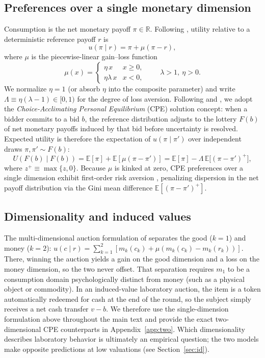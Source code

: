 \documentclass[11pt,a4paper]{article}
\theoremstyle{remark}
\begin{document}
\subsection{Preferences over a single monetary dimension}
Consumption is the net monetary payoff $\pi\in\mathbb{R}$. Following
\citet{koszegiRabin2006,koszegiRabin2007}, utility relative to a deterministic
reference payoff $r$ is
\begin{equation}
u(\pi\mid r)=\pi+\mu(\pi-r),
\end{equation}
where $\mu$ is the piecewise-linear gain--loss function
\begin{equation}
\mu(x)=\begin{cases}\eta\,x & x\ge0,\\ \eta\lambda\,x & x<0,\end{cases}
\qquad \lambda>1,\ \eta>0 .
\end{equation}
We normalize $\eta=1$ (or absorb $\eta$ into the composite parameter) and write
$\Lambda\equiv\eta(\lambda-1)\in[0,1)$ for the degree of loss aversion. Following
\citet{koszegiRabin2007} and \citet{banerji2014}, we adopt the
\emph{Choice-Acclimating Personal Equilibrium} (CPE) solution concept: when a
bidder commits to a bid $b$, the reference distribution adjusts to the lottery
$F(b)$ of net monetary payoffs induced by that bid before uncertainty is resolved.
Expected utility is therefore the expectation of $u(\pi\mid\pi')$ over independent
draws $\pi,\pi'\sim F(b)$:
\begin{equation}
U(F(b)\mid F(b)) = \mathbb{E}[\pi] + \mathbb{E}[\mu(\pi-\pi')]
= \mathbb{E}[\pi] - \Lambda\,\mathbb{E}\big[(\pi-\pi')^{+}\big],
\end{equation}
where $z^{+}\equiv\max\{z,0\}$. Because $\mu$ is kinked at zero, CPE preferences
over a single dimension exhibit first-order risk aversion \citep{koszegiRabin2007},
penalizing dispersion in the net payoff distribution via the Gini mean difference
$\mathbb{E}[(\pi-\pi')^{+}]$.

\subsection{Dimensionality and induced values}
\label{sec:dim}
The multi-dimensional auction formulation of \citet{langeRatan2010} separates the
good ($k=1$) and money ($k=2$):
$u(c\mid r)=\sum_{k=1}^2[m_k(c_k)+\mu(m_k(c_k)-m_k(r_k))]$. There, winning the
auction yields a gain on the good dimension and a loss on the money dimension, so
the two never offset. That separation requires $m_1$ to be a consumption domain
psychologically distinct from money (such as a physical object or commodity). In an
induced-value laboratory auction, the item is a token automatically redeemed for cash
at the end of the round, so the subject simply receives a net cash transfer $v-b$.
We therefore use the single-dimension formulation above throughout the main text and
provide the exact two-dimensional CPE counterparts in Appendix~\ref{app:two}. Which
dimensionality describes laboratory behavior is ultimately an empirical question;
the two models make opposite predictions at low valuations (see
Section~\ref{sec:id}).
\end{document}
